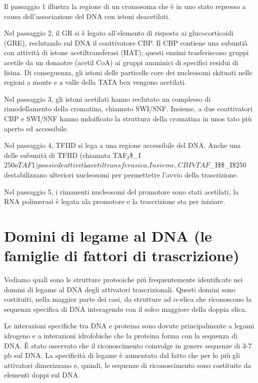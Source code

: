 \documentclass[11pt]{book}
\begin{document}
Il passaggio 1 illustra la regione di un cromosoma che è in uno stato
represso a causa dell'associazione del DNA con istoni deacetilati.

Nel passaggio 2, il GR si è legato all'elemento di risposta ai
glucocorticoidi (GRE), reclutando sul DNA il coattivatore CBP. Il CBP
contiene una subuntià con attività di istone acetiltransferasi (HAT);
questi enzimi trasferiscono gruppi acetile da un donaotre (acetil CoA)
ai gruppi amminici di specifici residui di lisina. Di conseguenza, gli
istoni delle particelle core dei nucleosomi skituati nelle regioni a
monte e a valle della TATA box vengono acetilati.

Nel passaggio 3, gli istoni acetilati hanno reclutato un complesso di
rimodellamento della cromatina, chiamato SWI/SNF. Insieme, a due
coattivatori CBP e SWI/SNF hanno mdoificato la struttura della cromatina
in unos tato più aperto ed accessibile.

Nel passaggio 4, TFIID si lega a una regione accessibile del DNA. Anche
una delle subunità di TFIID (chiamata
TAF\(_I\)\$\_I\(250 o TAF1) possiede attività acetiltransferasica. Insieme, CBP e TAF\)\_I\$\$\_I\$250
destabilizzano ulteriori nucleosomi per permettetre l'avvio della
trascrizione.

Nel passaggio 5, i rimanenti nucleosomi del promotore sono stati
acetilati, la RNA polimerasi è legata ala promotore e la trascrizione
sta per iniziare.

\section{Domini di legame al DNA (le famiglie di fattori di
trascrizione)}\label{domini-di-legame-al-dna-le-famiglie-di-fattori-di-trascrizione}

Vediamo quali sono le strutture proteoiche più frequentemente
identificate nei domini di legame al DNA degli attivatori
trascrizionali. Questi domini sono costituiti, nella maggior parte dei
casi, da strutture ad \(\alpha\)-elica che riconoscono la sequenza
specifica di DNA interagendo con il solco maggiore della doppia elica.

Le interazioni specifiche tra DNA e proteina sono dovute principalmente
a legami idrogeno e a interazioni idrofobiche che la proteina forma con
la sequenza di DNA. È stato osservato che il riconoscimento coinvolge
in genere sequenze di 3-7 pb sul DNA. La specificità di legame è
aumentata dal fatto che per lo più gli attivatori dimerizzano e, quindi,
le sequenze di riconoscimento sono costituite da elementi doppi sul DNA.
\end{document}
